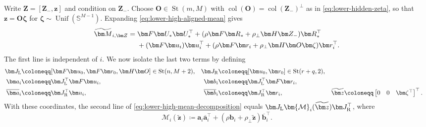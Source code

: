 \documentclass[11pt]{article}
\newcommand{\trans}{\top}
\DeclareMathOperator{\St}{St}
\begin{document}
Write $\bm Z=[\bm Z_-,\bm z]$ and condition on $\bm Z_-$.  Choose
$\bm O\in\St(m,M)$ with
$\operatorname{col}(\bm O)=\operatorname{col}(\bm Z_-)^\perp$ as in
\cref{eq:lower-hidden-zeta}, so that
$\bm z=\bm O\bm\zeta$ for
$\bm\zeta\sim\operatorname{Unif}(\mathbb S^{M-1})$.  Expanding
\cref{eq:lower-high-aligned-mean} gives
\begin{align}
  \widetilde{\bm M}_{i,\bm Z}
  ={}&
  \bm F\bm U_*\bm U_*^\trans
  +
  (\rho\bm F\bm R_*+\rho_\perp\bm H\bm Z_-)\bm R_*^\trans
  \notag\\
  &+
  (\bm F\bm u_i)\bm u_i^\trans
  +
  (\rho\bm F\bm r_i+\rho_\perp\bm H\bm O\bm\zeta)\bm r_i^\trans.
\label{eq:lower-high-mean-decomposition}
\end{align}
The first line is independent of $i$.  We now isolate the last two terms by
defining
\begin{equation}
\begin{aligned}
  \bm J_{\rm L}
  &\coloneqq
  [\bm F\bm u_0,\bm F\bm r_0,\bm H\bm O]
  \in\St(n,M+2),
  &
  \bm J_{\rm R}
  &\coloneqq
  [\bm u_0,\bm r_0]
  \in\St(r+q,2),\\
  \bm a_i&\coloneqq\bm J_{\rm L}^\trans\bm F\bm u_i,
  &
  \bm b_i&\coloneqq\bm J_{\rm L}^\trans\bm F\bm r_i,\\
  \overline{\bm a}_i&\coloneqq\bm J_{\rm R}^\trans\bm u_i,
  &
  \overline{\bm b}_i&\coloneqq\bm J_{\rm R}^\trans\bm r_i,
  &
  \widetilde{\bm z}&\coloneqq
  \begin{bmatrix}0&0&\bm\zeta^\trans\end{bmatrix}^\trans.
\end{aligned}
\label{eq:lower-high-reduced-coordinates}
\end{equation}
With these coordinates, the second line of
\cref{eq:lower-high-mean-decomposition} equals
$\bm J_{\rm L}\bm{\mathcal M}_i(\widetilde{\bm z})\bm J_{\rm R}^\trans$,
where
\begin{equation}
  \bm{\mathcal M}_i(\widetilde{\bm z})
  \coloneqq
  \bm a_i\overline{\bm a}_i^\trans
  +
  (\rho\bm b_i+\rho_\perp\widetilde{\bm z})
  \overline{\bm b}_i^\trans.
\label{eq:lower-high-reduced-mean-i}
\end{equation}
\end{document}
